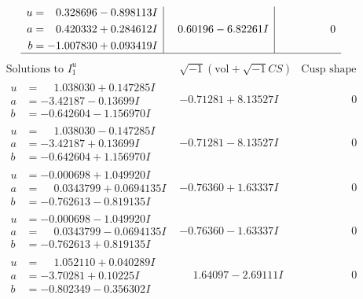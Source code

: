 \documentclass[1p]{elsarticle_modified}
\theoremstyle{definition}
\newcommand{\I}{\sqrt{-1}}
\begin{document}
$$\begin{array}{c|c|c}
\begin{aligned}
u &= \phantom{-}0.328696 - 0.898113 I \\
a &= \phantom{-}0.420332 + 0.284612 I \\
b &= -1.007830 + 0.093419 I\end{aligned}
 & \phantom{-}0.60196 - 6.82261 I & \phantom{-0.000000 } 0\\
 \hline 
 \end{array}$$\newpage$$\begin{array}{c|c|c}  
\text{Solutions to }I^u_{1}& \I (\text{vol} + \sqrt{-1}CS) & \text{Cusp shape}\\
 \hline 
\begin{aligned}
u &= \phantom{-}1.038030 + 0.147285 I \\
a &= -3.42187 - 0.13699 I \\
b &= -0.642604 - 1.156970 I\end{aligned}
 & -0.71281 + 8.13527 I & \phantom{-0.000000 } 0 \\ \hline\begin{aligned}
u &= \phantom{-}1.038030 - 0.147285 I \\
a &= -3.42187 + 0.13699 I \\
b &= -0.642604 + 1.156970 I\end{aligned}
 & -0.71281 - 8.13527 I & \phantom{-0.000000 } 0 \\ \hline\begin{aligned}
u &= -0.000698 + 1.049920 I \\
a &= \phantom{-}0.0343799 + 0.0694135 I \\
b &= -0.762613 - 0.819135 I\end{aligned}
 & -0.76360 + 1.63337 I & \phantom{-0.000000 } 0 \\ \hline\begin{aligned}
u &= -0.000698 - 1.049920 I \\
a &= \phantom{-}0.0343799 - 0.0694135 I \\
b &= -0.762613 + 0.819135 I\end{aligned}
 & -0.76360 - 1.63337 I & \phantom{-0.000000 } 0 \\ \hline\begin{aligned}
u &= \phantom{-}1.052110 + 0.040289 I \\
a &= -3.70281 + 0.10225 I \\
b &= -0.802349 - 0.356302 I\end{aligned}
 & \phantom{-}1.64097 - 2.69111 I & \phantom{-0.000000 } 0 \\ \hline\begin{aligned}

\end{aligned}
\end{array}$$
\end{document}
